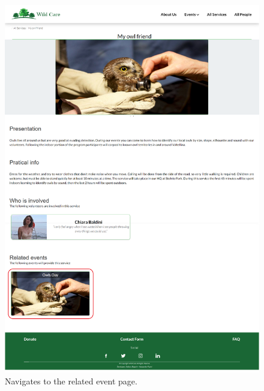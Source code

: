 	\begin{figure}[h!]
		\centering
		\begin{minipage}[b]{1\textwidth}
    			\includegraphics[width=\textwidth]{./assets/mockups/servicedetails_eventdetails.png}
			\caption{Navigates to the related event page.}
		\end{minipage}
	\end{figure}

